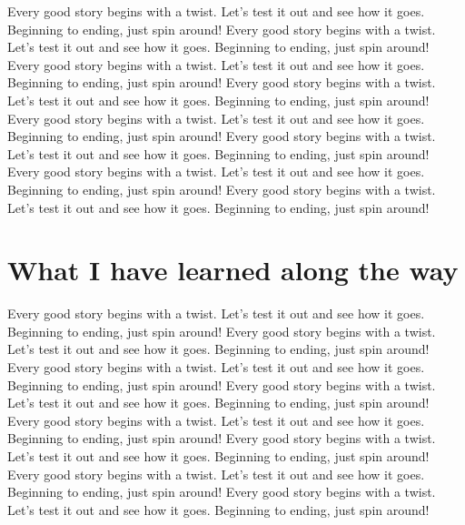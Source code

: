 Every good story begins with a twist. Let's test it out and see how it goes. Beginning to ending, just spin around! Every good story begins with a twist. Let's test it out and see how it goes. Beginning to ending, just spin around! Every good story begins with a twist. Let's test it out and see how it goes. Beginning to ending, just spin around! Every good story begins with a twist. Let's test it out and see how it goes. Beginning to ending, just spin around! Every good story begins with a twist. Let's test it out and see how it goes. Beginning to ending, just spin around! Every good story begins with a twist. Let's test it out and see how it goes. Beginning to ending, just spin around! Every good story begins with a twist. Let's test it out and see how it goes. Beginning to ending, just spin around! Every good story begins with a twist. Let's test it out and see how it goes. Beginning to ending, just spin around!

\section{What I have learned along the way}

Every good story begins with a twist. Let's test it out and see how it goes. Beginning to ending, just spin around! Every good story begins with a twist. Let's test it out and see how it goes. Beginning to ending, just spin around! Every good story begins with a twist. Let's test it out and see how it goes. Beginning to ending, just spin around! Every good story begins with a twist. Let's test it out and see how it goes. Beginning to ending, just spin around! Every good story begins with a twist. Let's test it out and see how it goes. Beginning to ending, just spin around! Every good story begins with a twist. Let's test it out and see how it goes. Beginning to ending, just spin around! Every good story begins with a twist. Let's test it out and see how it goes. Beginning to ending, just spin around! Every good story begins with a twist. Let's test it out and see how it goes. Beginning to ending, just spin around!